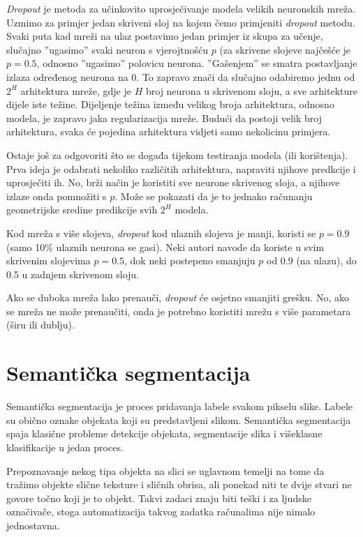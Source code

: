 \documentclass[times, utf8, diplomski, numeric]{fer}
\begin{document}
\emph{Dropout} je metoda za učinkovito uprosječivanje modela velikih neuronskih mreža\cite{hinton_dropout}. Uzmimo za primjer jedan skriveni sloj na kojem čemo primjeniti \emph{dropout} metodu. Svaki puta kad mreži na ulaz postavimo jedan primjer iz skupa za učenje, slučajno ''ugasimo'' svaki neuron s vjerojtnošću $p$ (za skrivene slojeve najčešće je $p = 0.5$, odnosno ''ugasimo'' polovicu neurona. ''Gašenjem'' se smatra postavljanje izlaza određenog neurona na 0. To zapravo znači da slučajno odabiremo jednu od $2^H$ arhitektura mreže, gdje je $H$ broj neurona u skrivenom sloju, a sve arhitekture dijele iste težine. Dijeljenje težina između velikog broja arhitektura, odnosno modela, je zapravo jaka regularizacija mreže. Budući da postoji velik broj arhitektura, svaka će pojedina arhitektura vidjeti samo nekolicinu primjera.

Ostaje još za odgovoriti što se događa tijekom testiranja modela (ili korištenja). Prva ideja je odabrati nekoliko različitih arhitektura, napraviti njihove predkcije i uprosječiti ih. No, brži način je koristiti sve neurone skrivenog sloja, a njihove izlaze onda pomnožiti s $p$. Može se pokazati da je to jednako računanju geometrijske sredine predikcije svih $2^H$ modela.

Kod mreža s više slojeva, \emph{dropout} kod ulaznih slojeva je manji, koristi se $p = 0.9$ (samo 10\% ulaznih neurona se gasi). Neki autori navode da koriste u svim skrivenim slojevima $p = 0.5$, dok neki postepeno smanjuju $p$ od 0.9 (na ulazu), do 0.5 u zadnjem skrivenom sloju.

Ako se duboka mreža lako prenauči, \emph{dropout} će osjetno smanjiti grešku. No, ako se mreža ne može prenaučiti, onda je potrebno koristiti mrežu s više parametara (širu ili dublju).


\chapter{Semantička segmentacija}

Semantička segmentacija je proces pridavanja labele svakom pikselu slike. Labele su obično oznake objekata koji su predstavljeni slikom.
Semantička segmentacija spaja klasične probleme detekcije objekata, segmentacije slika i višeklasne klasifikacije u jedan proces.

Prepoznavanje nekog tipa objekta na slici se uglavnom temelji na tome da tražimo objekte slične teksture i sličnih obrisa, ali ponekad niti te dvije stvari ne govore točno koji je to objekt. Takvi zadaci znaju biti teški i za ljudske označivače, stoga automatizacija takvog zadatka računalima nije nimalo jednostavna.
\end{document}
